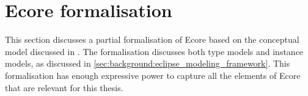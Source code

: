 \section{Ecore formalisation}
\label{sec:formalisations:ecore_formalisation}

This section discusses a partial formalisation of Ecore based on the conceptual model discussed in \cite{bruintjes_bridging-groove}. The formalisation discusses both type models and instance models, as discussed in \cref{sec:background:eclipse_modeling_framework}. This formalisation has enough expressive power to capture all the elements of Ecore that are relevant for this thesis.



